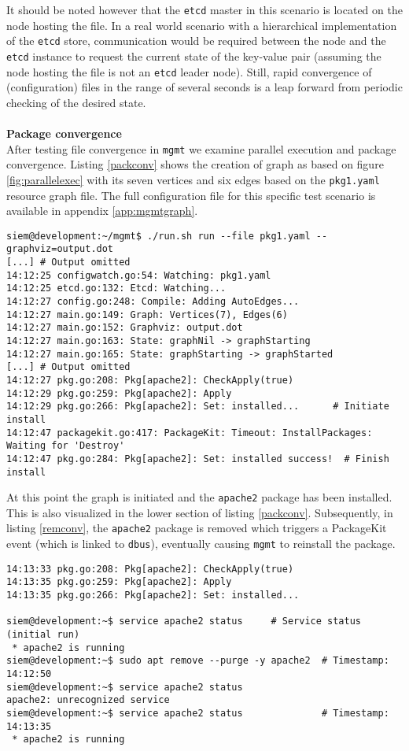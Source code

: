 \noindent
It should be noted however that the \texttt{etcd} master in this scenario is located on the node hosting the file. In a real world scenario with a hierarchical implementation of the \texttt{etcd} store, communication would be required between the node and the \texttt{etcd} instance to request the current state of the key-value pair (assuming the node hosting the file is not an \texttt{etcd} leader node). Still, rapid convergence of (configuration) files in the range of several seconds is a leap forward from periodic checking of the desired state.
\\\\
\noindent
\textbf{Package convergence}\\
After testing file convergence in \texttt{mgmt} we examine parallel execution and package convergence. Listing \ref{packconv} shows the creation of graph as based on figure \ref{fig:parallelexec} with its seven vertices and six edges based on the \texttt{pkg1.yaml} resource graph file. The full configuration file for this specific test scenario is available in appendix \ref{app:mgmtgraph}.
\\
\begin{lstlisting}[caption={Graph initiation for package convergence},label=packconv]
siem@development:~/mgmt$ ./run.sh run --file pkg1.yaml --graphviz=output.dot
[...] # Output omitted
14:12:25 configwatch.go:54: Watching: pkg1.yaml
14:12:25 etcd.go:132: Etcd: Watching...
14:12:27 config.go:248: Compile: Adding AutoEdges...
14:12:27 main.go:149: Graph: Vertices(7), Edges(6)
14:12:27 main.go:152: Graphviz: output.dot
14:12:27 main.go:163: State: graphNil -> graphStarting
14:12:27 main.go:165: State: graphStarting -> graphStarted
[...] # Output omitted
14:12:27 pkg.go:208: Pkg[apache2]: CheckApply(true)
14:12:29 pkg.go:259: Pkg[apache2]: Apply
14:12:29 pkg.go:266: Pkg[apache2]: Set: installed...      # Initiate install
14:12:47 packagekit.go:417: PackageKit: Timeout: InstallPackages: Waiting for 'Destroy'
14:12:47 pkg.go:284: Pkg[apache2]: Set: installed success!  # Finish install
\end{lstlisting}
\noindent
At this point the graph is initiated and the \texttt{apache2} package has been installed. This is also visualized in the lower section of listing \ref{packconv}. Subsequently, in listing \ref{remconv}, the \texttt{apache2} package is removed which triggers a PackageKit event (which is linked to \texttt{dbus}), eventually causing \texttt{mgmt} to reinstall the package. 
\\
\begin{lstlisting}[caption={PackageKit convergence in \texttt{mgmt}},label=remconv]
14:13:33 pkg.go:208: Pkg[apache2]: CheckApply(true)
14:13:35 pkg.go:259: Pkg[apache2]: Apply
14:13:35 pkg.go:266: Pkg[apache2]: Set: installed...

siem@development:~$ service apache2 status     # Service status (initial run)
 * apache2 is running
siem@development:~$ sudo apt remove --purge -y apache2  # Timestamp: 14:12:50
siem@development:~$ service apache2 status
apache2: unrecognized service
siem@development:~$ service apache2 status              # Timestamp: 14:13:35
 * apache2 is running
\end{lstlisting}


